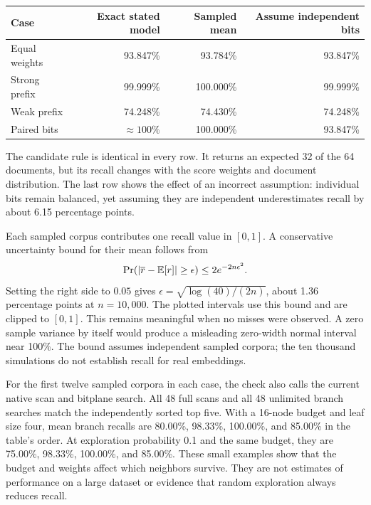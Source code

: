 \begin{center}\small
\begin{tabular}{@{}lrrr@{}}
\toprule
Case & Exact stated model & Sampled mean & Assume independent bits\\\midrule
Equal weights & 93.847\% & 93.784\% & 93.847\%\\
Strong prefix & 99.999\% & 100.000\% & 99.999\%\\
Weak prefix & 74.248\% & 74.430\% & 74.248\%\\
Paired bits & $\approx100\%$ & 100.000\% & 93.847\%\\\bottomrule
\end{tabular}\normalsize
\end{center}
The candidate rule is identical in every row. It returns an expected 32 of the 64 documents,
but its recall changes with the score weights and document distribution. The last row shows
the effect of an incorrect assumption: individual bits remain balanced, yet assuming they are independent
underestimates recall by about 6.15 percentage points.


Each sampled corpus contributes one recall value in $[0,1]$. A conservative uncertainty bound
for their mean follows from
\[
\Pr(|\overline r-\mathbb E[r]|\ge\epsilon)\le2e^{-2n\epsilon^2}.
\]
Setting the right side to $0.05$ gives
$\epsilon=\sqrt{\log(40)/(2n)}$, about 1.36 percentage points at $n=10{,}000$.
The plotted intervals use this bound and are clipped to $[0,1]$. This remains meaningful when
no misses were observed. A zero sample variance by itself would produce a misleading zero-width
normal interval near 100\%. The bound assumes independent sampled corpora; the ten thousand
simulations do not establish recall for real embeddings.

For the first twelve sampled corpora in each case, the check also calls the current native
scan and bitplane search. All 48 full scans and all 48 unlimited branch searches match the
independently sorted top five. With a 16-node budget and leaf size four, mean branch recalls
are 80.00\%, 98.33\%, 100.00\%, and 85.00\% in the table's order. At exploration probability
0.1 and the same budget, they are 75.00\%, 98.33\%, 100.00\%, and 85.00\%. These small examples
show that the budget and weights affect which neighbors survive. They are not estimates of
performance on a large dataset or evidence that random exploration always reduces recall.

